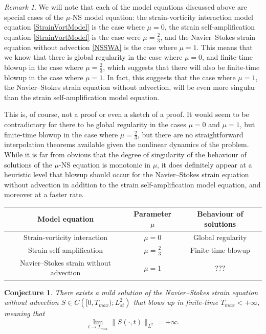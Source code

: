 \documentclass[11pt]{article}
\theoremstyle{plain}
\newtheorem{conjecture}[theorem]{Conjecture}
\theoremstyle{remark}
\newtheorem{remark}[theorem]{Remark}
\numberwithin{equation}{section}
\begin{document}
\begin{remark}
We will note that each of the model equations discussed above are special cases of the $\mu$-NS model equation: 
the strain-vorticity interaction model equation \eqref{StrainVortModel} 
is the case where $\mu=0$,
the strain self-amplification equation \eqref{StrainVortModel} 
is the case were $\mu=\frac{2}{3}$,
and the Navier--Stokes strain equation without advection
\eqref{NSSWA} is the case where $\mu=1$.
This means that we know that there is global regularity in the case where $\mu=0$, and finite-time blowup in the case where $\mu=\frac{2}{3}$,
which suggests that there will also be finite-time blowup in the case where $\mu=1$.
In fact, this suggests that the case where $\mu=1$, the Navier--Stokes strain equation without advection, will be even more singular than the strain self-amplification model equation.

This is, of course, not a proof or even a sketch of a proof. It would seem to be contradictory for there to be global regularity in the cases $\mu=0$ and $\mu=1$, but finite-time blowup in the case where $\mu=\frac{2}{3}$, but there are no straightforward interpolation theorems available given the nonlinear dynamics of the problem.
While it is far from obvious that the degree of singularity of the behaviour of solutions of the $\mu$-NS equation is monotonic in $\mu$, it does definitely appear at a heuristic level that blowup should occur for the Navier--Stokes strain equation without advection in addition to the strain self-amplification model equation, and moreover at a faster rate.
\end{remark}


\begin{center}
 \begin{tabular}{||c |c| c| |} 
 \hline
 Model equation & Parameter $\mu$ 
 & Behaviour of solutions  \\ [0.5ex] 
 \hline\hline
 Strain-vorticity interaction 
 & $\mu=0$ & Global regularity  \\ [.5ex]
 \hline
 Strain self-amplification 
 & $\mu=\frac{2}{3}$ & Finite-time blowup \\ [.5ex]
 \hline
 Navier--Stokes strain without advection
 & $\mu=1$ & ??? \\ [.5ex] 
 \hline
\end{tabular}
\end{center}


\begin{conjecture}
There exists a mild solution of the Navier--Stokes strain equation without advection $S\in C\left([0,T_{max});L^2_{st}\right)$ that blows up in finite-time $T_{max}<+\infty$, meaning that
\begin{equation}
    \lim_{t\to T_{max}}\|S(\cdot,t)\|_{L^2}=+\infty.
\end{equation}
\end{conjecture}
\end{document}
